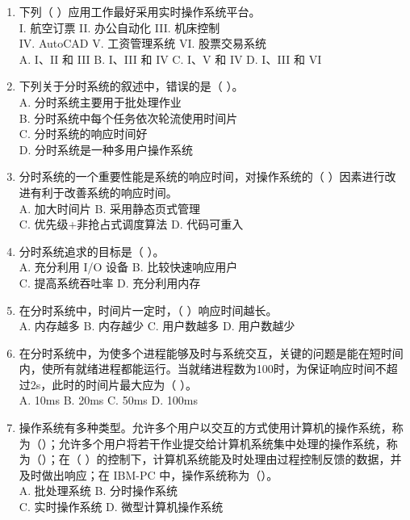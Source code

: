\documentclass[lang=cn,newtx,10pt,scheme=chinese]{../../elegantbook}
\begin{document}
\begin{enumerate}
  \item 下列（ ）应用工作最好采用实时操作系统平台。\\
  I. 航空订票 \quad II. 办公自动化 \quad III. 机床控制\\
  IV. AutoCAD \quad V. 工资管理系统 \quad VI. 股票交易系统\\
  A. I、II 和 III \quad B. I、III 和 IV \quad C. I、V 和 IV \quad D. I、III 和 VI

  \item 下列关于分时系统的叙述中，错误的是（ ）。\\
  A. 分时系统主要用于批处理作业\\
  B. 分时系统中每个任务依次轮流使用时间片\\
  C. 分时系统的响应时间好\\
  D. 分时系统是一种多用户操作系统
  \item 分时系统的一个重要性能是系统的响应时间，对操作系统的（ ）因素进行改进有利于改善系统的响应时间。\\
  A. 加大时间片 \quad B. 采用静态页式管理\\
  C. 优先级+非抢占式调度算法 \quad D. 代码可重入

  \item 分时系统追求的目标是（ ）。\\
  A. 充分利用 I/O 设备 \quad B. 比较快速响应用户\\
  C. 提高系统吞吐率 \quad D. 充分利用内存

  \item 在分时系统中，时间片一定时，（ ）响应时间越长。\\
  A. 内存越多 \quad B. 内存越少 \quad C. 用户数越多 \quad D. 用户数越少

  \item 在分时系统中，为使多个进程能够及时与系统交互，关键的问题是能在短时间内，使所有就绪进程都能运行。当就绪进程数为100时，为保证响应时间不超过2s，此时的时间片最大应为（ ）。\\
  A. 10ms \quad B. 20ms \quad C. 50ms \quad D. 100ms

  \item 操作系统有多种类型。允许多个用户以交互的方式使用计算机的操作系统，称为（）；允许多个用户将若干作业提交给计算机系统集中处理的操作系统，称为（）；在（ ）的控制下，计算机系统能及时处理由过程控制反馈的数据，并及时做出响应；在 IBM-PC 中，操作系统称为（）。\\
  A. 批处理系统 \quad B. 分时操作系统\\
  C. 实时操作系统 \quad D. 微型计算机操作系统


\end{enumerate}
\end{document}
